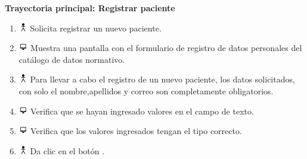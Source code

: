 \textbf{Trayectoria principal: Registrar paciente}  
\begin{enumerate}
\item \includegraphics[height=1em]{pictures/actor.png} Solicita registrar un nuevo paciente.
\item \includegraphics[height=1em]{pictures/sistema.png} Muestra una pantalla con el formulario de registro de datos personales del catálogo de datos normativo.
\item \includegraphics[height=1em]{pictures/actor.png} Para llevar a cabo el registro de un nuevo paciente, los datos solicitados, con solo el nombre,apellidos y correo son completamente obligatorios.
\item \includegraphics[height=1em]{pictures/sistema.png} Verifica que se hayan ingresado valores en el campo de texto.
\item \includegraphics[height=1em]{pictures/sistema.png} Verifica que los valores ingresados tengan el tipo correcto.
\item \includegraphics[height=1em]{pictures/actor.png} Da clic en el botón .
\end{enumerate} \bigskip


